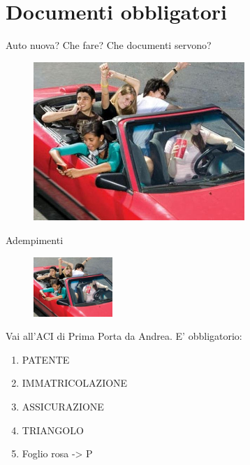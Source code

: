     
    
\section{Documenti obbligatori}
    
    
\begin{frame}{Auto nuova?}
	Che fare? Che documenti servono?
    	\begin{figure}[ht!]
    		\centering
         		\includegraphics[width = 8cm]{images/new_car.jpg}
    	\end{figure}
\end{frame}
    
    
    

        

        
\begin{frame}{Adempimenti}
	\transdissolve<1>
	\begin{figure}[ht!]
    		\centering
         		\includegraphics[width = 3cm]{images/new_car.jpg}
    	\end{figure}
    	Vai all'ACI di Prima Porta da Andrea. E' obbligatorio:
    	
    		\begin{enumerate}
    			\item<2-> PATENTE 		
   		 	\item<3-> IMMATRICOLAZIONE
    			\item<4-> ASSICURAZIONE
    			\item<5-> TRIANGOLO
    			\item<6-> Foglio rosa -> P
    		\end{enumerate}
\end{frame}
 
